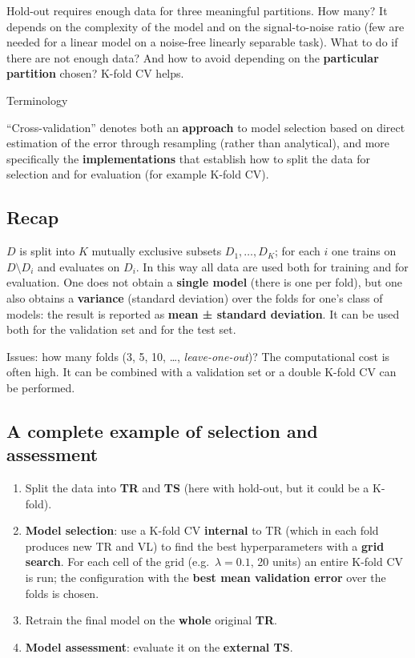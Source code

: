 Hold-out requires enough data for three meaningful partitions. How
many? It depends on the complexity of the model and on the
signal-to-noise ratio (few are needed for a linear model on a
noise-free linearly separable task). What to do if there are not
enough data? And how to avoid depending on the \textbf{particular
partition} chosen? K-fold CV helps.

\begin{boxnote}{Terminology}

``Cross-validation'' denotes both an \textbf{approach} to model
selection based on direct estimation of the error through resampling
(rather than analytical), and more specifically the
\textbf{implementations} that establish how to split the data for
selection and for evaluation (for example K-fold CV).

\end{boxnote}

\subsection{Recap}\label{richiamo}

\(D\) is split into \(K\) mutually exclusive subsets
\(D_1,\dots,D_K\); for each \(i\) one trains on \(D \setminus D_i\) and
evaluates on \(D_i\). In this way all data are used both for training
and for evaluation. One does not obtain a \textbf{single model} (there
is one per fold), but one also obtains a \textbf{variance} (standard
deviation) over the folds for one's class of models: the result is
reported as \textbf{mean ± standard deviation}. It can be used both for
the validation set and for the test set.

Issues: how many folds (3, 5, 10, \ldots, \emph{leave-one-out})? The
computational cost is often high. It can be combined with a validation
set or a double K-fold CV can be performed.

\subsection{A complete example of selection and
assessment}\label{un-esempio-completo-di-selezione-e-valutazione}

\begin{enumerate}
\def\labelenumi{\arabic{enumi}.}
\tightlist
\item
  Split the data into \textbf{TR} and \textbf{TS} (here with hold-out,
  but it could be a K-fold).
\item
  \textbf{Model selection}: use a K-fold CV \textbf{internal} to TR
  (which in each fold produces new TR and VL) to find the best
  hyperparameters with a \textbf{grid search}. For each cell of the
  grid (e.g.\ \(\lambda = 0.1\), 20 units) an entire K-fold CV is run;
  the configuration with the \textbf{best mean validation error} over
  the folds is chosen.
\item
  Retrain the final model on the \textbf{whole} original \textbf{TR}.
\item
  \textbf{Model assessment}: evaluate it on the \textbf{external TS}.
\end{enumerate}

